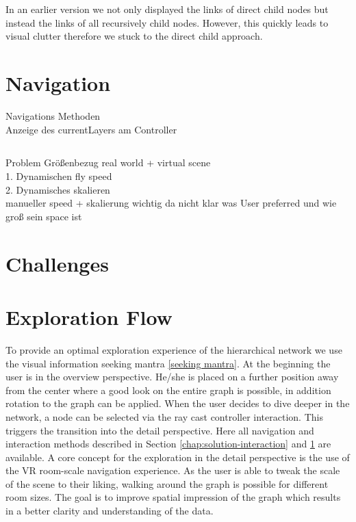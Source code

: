 In an earlier version we not only displayed the links of direct child nodes but instead the links of all recursively child nodes. However, this quickly leads to visual clutter therefore we stuck to the direct child approach.


\section{Navigation }
\label{chap:solution-navigation}
Navigations Methoden\\
Anzeige des currentLayers am Controller\\

\subsection{}
Problem Größenbezug real world + virtual scene\\
1. Dynamischen fly speed\\
2. Dynamisches skalieren\\
manueller speed + skalierung wichtig da nicht klar was User preferred und wie groß sein space ist\\ 
\section{Challenges}




\section{Exploration Flow}
To provide an optimal exploration experience of the hierarchical network we use the visual information seeking mantra \ref{seeking mantra}. 
At the beginning the user is in the overview perspective. He/she is placed on a further position away from the center where a good look on the entire graph is possible, in addition rotation to the graph can be applied.
When the user decides to dive deeper in the network, a node can be selected via the ray cast controller interaction. This triggers the transition into the detail perspective. 
Here all navigation and interaction methods described in Section \ref{chap:solution-interaction} and \ref{chap:solution-navigation}
are available. 
A core concept for the exploration in the detail perspective is the use of the VR room-scale navigation experience. As the user is able to tweak the scale of the scene to their liking, walking around the graph is possible for different room sizes. The goal is to improve spatial impression of the graph which results in a better clarity and understanding of the data.

